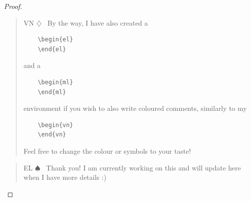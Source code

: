 \documentclass[12pt]{article}
\newenvironment{vn}{\begin{quote}\color{myviolet} \small\sf VN $\diamondsuit$~}{\end{quote}}
\newenvironment{el}{\begin{quote}\color{amethyst} \small\sf EL $\spadesuit$~}{\end{quote}}
\newenvironment{ml}{\begin{quote}\color{carrotorange} \small\sf ML $\clubsuit$~}{\end{quote}}
\begin{document}
\begin{proof}
    






\begin{vn}
 By the way, I have also created a \begin{verbatim}
    \begin{el}
    \end{el}
\end{verbatim} and a
\begin{verbatim}
    \begin{ml}
    \end{ml}
\end{verbatim}
environment if you wish to also write coloured comments, similarly to my
\begin{verbatim}
    \begin{vn}
    \end{vn}
\end{verbatim}
 Feel free to change the colour or symbols to your taste!
\end{vn}

\begin{el}
    Thank you! I am currently working on this and will update here when I have more details :)
\end{el}
    
\end{proof}
\end{document}
